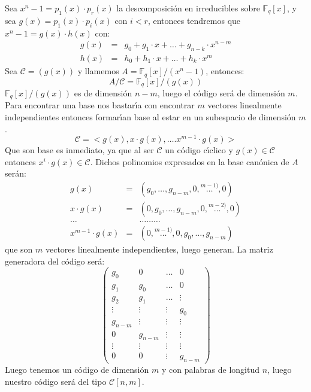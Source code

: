 Sea $x^n-1=p_1(x)\cdot p_r(x)$ la descomposici\'on en irreducibles sobre
$\mathbb{F}_q[x]$, y sea $g(x)=p_1(x)\cdot p_i(x)$ con $i<r$, entonces
tendremos que $x^n-1= g(x)\cdot h(x)$ con:
\begin{eqnarray*}
g(x)&=&g_0+g_1\cdot x+\dots+g_{n-k}\cdot x^{n-m}\\
h(x)&=&h_0+h_1\cdot x+\dots+h_k\cdot x^m
\end{eqnarray*}
Sea $\mathcal{C}=(g(x))$ y llamemos $A=\mathbb{F}_q[x]/(x^n-1)$, entonces:
\begin{displaymath}
A/\mathcal{C} = \mathbb{F}_q[x]/(g(x))
\end{displaymath}
$\mathbb{F}_q[x]/(g(x))$ es de dimensi\'on $n-m$, luego el c\'odigo ser\'a
de dimensi\'on $m$. Para encontrar una base nos bastar\'{\i}a con encontrar
$m$ vectores linealmente independientes entonces formar\'{\i}an base al estar
en un subespacio de dimensi\'on $m$.
\begin{displaymath}
\mathcal{C} = <g(x),x\cdot g(x),\dots.x^{m-1}\cdot g(x)>
\end{displaymath}
Que son base es inmediato, ya que al ser $\mathcal{C}$ un c\'odigo c\'{\i}clico
y $g(x)\in \mathcal{C}$ entonces $x^i\cdot g(x)\in \mathcal{C}$. Dichos
polinomios expresados en la base can\'onica de $A$ ser\'an:
\begin{eqnarray*}
g(x)&=& (g_0,\dots,g_{n-m},0,\stackrel{m-1)}\dots,0)\\
x\cdot g(x)&=&(0,g_0,\dots,g_{n-m},0,\stackrel{m-2)}\dots,0)\\
\dots& &\dots \dots \dots\\
x^{m-1}\cdot g(x)&=&(0,\stackrel{m-1)}\dots,0,g_0,\dots,g_{n-m})
\end{eqnarray*}
que son $m$ vectores linealmente independientes, luego generan. La matriz
generadora del c\'odigo ser\'a:
\begin{displaymath}
\left( \begin{array}{cccc}
g_0&0&\dots & 0 \\
g_1&g_0&\dots& 0 \\
g_2&g_1&\dots& \vdots \\
\vdots &\vdots &\vdots & g_0 \\
g_{n-m}&\vdots & \vdots &\vdots \\
0&g_{n-m}& \vdots &\vdots\\
\vdots &\vdots &\vdots & \vdots\\
0&0& \vdots & g_{n-m} 
\end{array}\right)
\end{displaymath}
Luego tenemos un c\'odigo de dimensi\'on $m$ y con palabras de longitud $n$,
luego nuestro c\'odigo ser\'a del tipo $\mathcal{C}[n,m]$.

